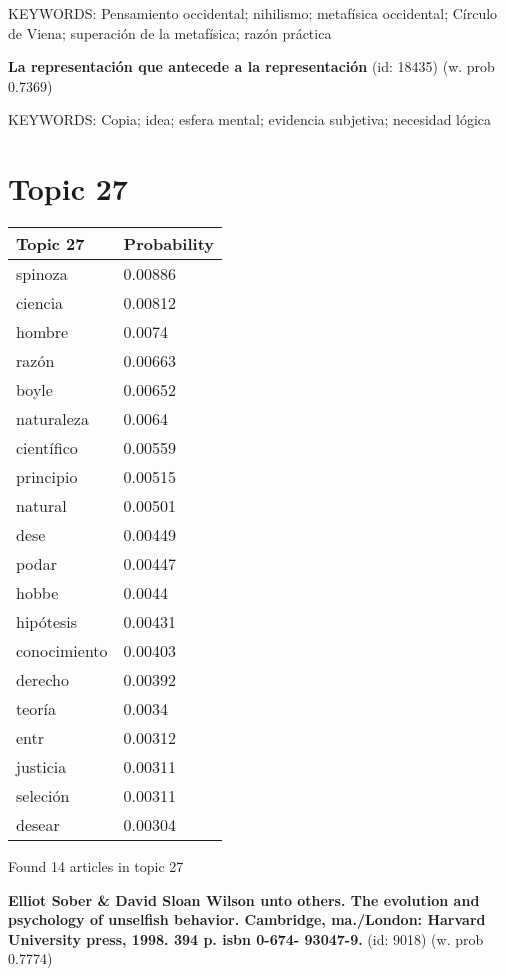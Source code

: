 \documentclass{article}
\begin{document}
KEYWORDS:
Pensamiento occidental; nihilismo; metafísica occidental; Círculo de Viena; superación de la metafísica; razón práctica
\vfill

\textbf{La representación que antecede a la representación} (id: 18435)
 (w. prob 0.7369)


KEYWORDS:
Copia; idea; esfera mental; evidencia subjetiva; necesidad lógica

\vfill
\newpage


\centering
\thispagestyle{empty}
\section*{Topic 27}\vfill
\begin{tabular}{ll}
\toprule
     Topic 27 & Probability \\
\midrule
      spinoza &     0.00886 \\
      ciencia &     0.00812 \\
       hombre &      0.0074 \\
        razón &     0.00663 \\
        boyle &     0.00652 \\
   naturaleza &      0.0064 \\
   científico &     0.00559 \\
    principio &     0.00515 \\
      natural &     0.00501 \\
         dese &     0.00449 \\
        podar &     0.00447 \\
        hobbe &      0.0044 \\
    hipótesis &     0.00431 \\
 conocimiento &     0.00403 \\
      derecho &     0.00392 \\
       teoría &      0.0034 \\
         entr &     0.00312 \\
     justicia &     0.00311 \\
     seleción &     0.00311 \\
       desear &     0.00304 \\
\bottomrule
\end{tabular}

\vfill
Found 14 articles in topic 27
\vfill

\textbf{Elliot Sober \& David Sloan Wilson unto others. The evolution and psychology of unselfish behavior. Cambridge, ma./London: Harvard University press, 1998. 394 p. isbn 0-674- 93047-9.} (id: 9018)
 (w. prob 0.7774)
\end{document}
